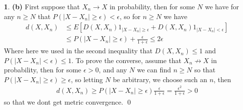 \documentclass[10.5pt]{article}
\theoremstyle{definition}
\newtheorem{pb}{}
\newcommand{\abs}[1]{\lvert#1\rvert}
\begin{document}
\begin{pb}
        \textbf{(b)} First suppose that \(X_n \to X\) in probability, then for some \(N\) we have for any \(n \geq N\) that \(P(\abs{X - X_n} \geq \epsilon) < \epsilon\), so for \(n \geq N\) we have
        \begin{align*}
            d(X,X_n) &\leq E[D(X,X_n)1_{\abs{X-X_n} \geq \epsilon} + D(X,X_n)1_{\abs{X-X_n} < \epsilon}] \\
            &\leq P(\abs{X-X_n} \geq \epsilon) + \frac{\epsilon}{1 + \epsilon} \leq 2 \epsilon
        \end{align*}
        Where here we used in the second inequality that \(D(X,X_n) \leq 1\) and \(P(\abs{X - X_n} < \epsilon) \leq 1\). To prove the converse, assume that \(X_n \not \to X\) in probability, then for some \(\epsilon > 0\), and any \(N\) we can find \(n \geq N\) so that \(P(\abs{X - X_n} \geq \epsilon) \geq \epsilon\), so letting \(N\) be arbitrary, we choose such an \(n\), then
        \begin{align*}
            d(X,X_n) \geq P(\abs{X - X_n} \geq \epsilon)\frac{\epsilon}{1+\epsilon} = \frac{\epsilon^2}{1+\epsilon} > 0
        \end{align*}
        so that we dont get metric convergence. \qed
    \end{pb}
\end{document}
